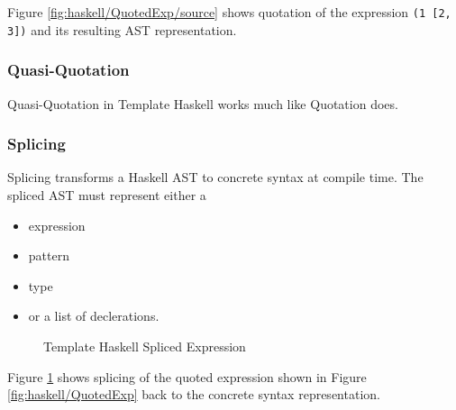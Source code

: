 Figure \ref{fig:haskell/QuotedExp/source} shows quotation of the expression \lstinline{(1 [2, 3])} and its resulting AST representation.


\subsubsection{Quasi-Quotation}

Quasi-Quotation in Template Haskell works much like Quotation does.

\subsubsection{Splicing}

Splicing transforms a Haskell AST to concrete syntax at compile time.
The spliced AST must represent either a
\begin{itemize}
	\item expression
	\item pattern
	\item type
	\item or a list of declerations.
\end{itemize}

\begin{figure}[h]
	
	\caption{Template Haskell Spliced Expression \label{fig:haskell/SplicedExp}}
\end{figure}

Figure \ref{fig:haskell/SplicedExp} shows splicing of the quoted expression shown in Figure \ref{fig:haskell/QuotedExp} back to the concrete syntax representation.

